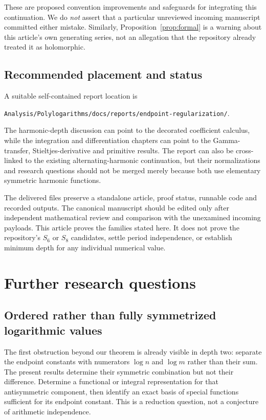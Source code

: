 \documentclass[11pt,oneside]{article}
\numberwithin{equation}{section}
\theoremstyle{definition}
\theoremstyle{remark}
\newcommand{\src}[1]{\nolinkurl{#1}}
\begin{document}
These are proposed convention improvements and safeguards for integrating
this continuation. We do \emph{not} assert that a particular unreviewed
incoming manuscript committed either mistake. Similarly,
Proposition~\ref{prop:formal} is a warning about this article's own generating
series, not an allegation that the repository already treated it as
holomorphic.

\subsection{Recommended placement and status}

A suitable self-contained report location is
\begin{center}
\src{Analysis/Polylogarithms/docs/reports/endpoint-regularization/}.
\end{center}
The harmonic-depth discussion can point to the decorated coefficient
calculus, while the integration and differentiation chapters can point to
the Gamma-transfer, Stieltjes-derivative and primitive results. The report
can also be cross-linked to the existing alternating-harmonic continuation,
but their normalizations and research questions should not be merged merely
because both use elementary symmetric harmonic functions.

The delivered files preserve a standalone article, proof status, runnable
code and recorded outputs. The canonical manuscript should be edited only
after independent mathematical review and comparison with the unexamined
incoming payloads. This article proves the families stated here. It does not
prove the repository's $S_6$ or $S_8$ candidates, settle period independence,
or establish minimum depth for any individual numerical value.

\section{Further research questions}
\label{sec:questions}

\subsection{Ordered rather than fully symmetrized logarithmic values}

The first obstruction beyond our theorem is already visible in depth two:
separate the endpoint constants with numerators $\log n$ and $\log m$ rather
than their sum. The present results determine their symmetric combination
but not their difference. Determine a functional or integral representation
for that antisymmetric component, then identify an exact basis of special
functions sufficient for its endpoint constant. This is a reduction question,
not a conjecture of arithmetic independence.
\end{document}
